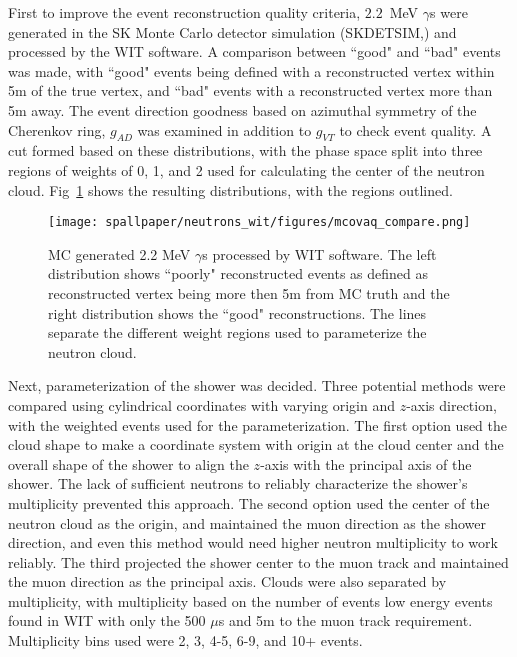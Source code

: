 First to improve the event reconstruction quality criteria, $2.2$~MeV $\gamma$s were generated in the SK Monte Carlo detector simulation (SKDETSIM,\cite{skdetsim}) and processed by the WIT software. A comparison between ``good" and ``bad" events was made, with ``good" events being defined with a reconstructed vertex within 5m of the true vertex, and ``bad" events with a reconstructed vertex more than 5m away. The event direction goodness based on azimuthal symmetry of the Cherenkov ring, $g_{AD}$ was examined in addition to $g_{VT}$ to check event quality. A cut formed based on these distributions, with the phase space split into three regions of weights of 0, 1, and 2 used for calculating the center of the neutron cloud. Fig~\ref{fig:mcovaq} shows the resulting distributions, with the regions outlined.

\begin{figure}
    \centering
    \texttt{[image: spallpaper/neutrons\_wit/figures/mcovaq\_compare.png]}
    \caption{MC generated 2.2 MeV $\gamma$s processed by WIT software. The left distribution shows ``poorly" reconstructed events as defined as reconstructed vertex being more then 5m from MC truth and the right distribution shows the ``good" reconstructions. The lines separate the different weight regions used to parameterize the neutron cloud.}
    \label{fig:mcovaq}
\end{figure}

Next, parameterization of the shower was decided. Three potential methods were compared using cylindrical coordinates with varying origin and $z$-axis direction, with the weighted events used for the parameterization. The first option used the cloud shape to make a coordinate system with origin at the cloud center and the overall shape of the shower to align the $z$-axis with the principal axis of the shower. The lack of sufficient neutrons to reliably characterize the shower's multiplicity prevented this approach. The second option used the center of the neutron cloud as the origin, and maintained the muon direction as the shower direction, and even this method would need higher neutron multiplicity to work reliably. The third projected the shower center to the muon track and maintained the muon direction as the principal axis. Clouds were also separated by multiplicity, with multiplicity based on the number of events low energy events found in WIT with only the 500 $\mu$s and 5m to the muon track requirement. Multiplicity bins used were 2, 3, 4-5, 6-9, and 10+ events. 

